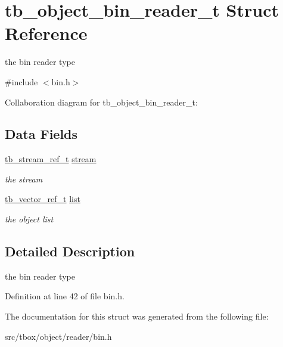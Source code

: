 \hypertarget{structtb__object__bin__reader__t}{\section{tb\-\_\-object\-\_\-bin\-\_\-reader\-\_\-t Struct Reference}
\label{structtb__object__bin__reader__t}
}


the bin reader type  




{\ttfamily \#include $<$bin.\-h$>$}



Collaboration diagram for tb\-\_\-object\-\_\-bin\-\_\-reader\-\_\-t\-:
\subsection*{Data Fields}
\begin{DoxyCompactItemize}
\item 
\hypertarget{structtb__object__bin__reader__t_a673962f4328a8f1e38b7a88f6d7ab261}{\hyperlink{structtb__stream__ref__t}{tb\-\_\-stream\-\_\-ref\-\_\-t} \hyperlink{structtb__object__bin__reader__t_a673962f4328a8f1e38b7a88f6d7ab261}{stream}}\label{structtb__object__bin__reader__t_a673962f4328a8f1e38b7a88f6d7ab261}

\begin{DoxyCompactList}\small\item\em the stream \end{DoxyCompactList}\item 
\hypertarget{structtb__object__bin__reader__t_a4d207c7fa34caa95cbeef7f3d5fdf030}{\hyperlink{vector_8h_ab56a3136ea68418323e7015af7bf5035}{tb\-\_\-vector\-\_\-ref\-\_\-t} \hyperlink{structtb__object__bin__reader__t_a4d207c7fa34caa95cbeef7f3d5fdf030}{list}}\label{structtb__object__bin__reader__t_a4d207c7fa34caa95cbeef7f3d5fdf030}

\begin{DoxyCompactList}\small\item\em the object list \end{DoxyCompactList}\end{DoxyCompactItemize}


\subsection{Detailed Description}
the bin reader type 

Definition at line 42 of file bin.\-h.



The documentation for this struct was generated from the following file\-:\begin{DoxyCompactItemize}
\item 
src/tbox/object/reader/bin.\-h\end{DoxyCompactItemize}
